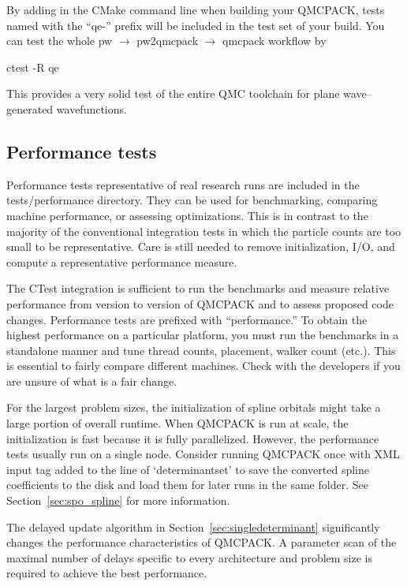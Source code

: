 By adding  in the CMake command line when building your QMCPACK,
tests named with the ``qe-'' prefix will be included in the test set of your build.
You can test the whole pw $\to$ pw2qmcpack $\to$ qmcpack workflow by

\begin{shade}
ctest -R qe
\end{shade}
This provides a very solid test of the entire QMC
toolchain for plane wave--generated wavefunctions.

\subsection{Performance tests}
\label{sec:perftests}
Performance tests representative of real research runs are included in the
tests/performance directory. They can be used for benchmarking, comparing machine
performance, or assessing optimizations. This is in
contrast to the majority of the conventional integration tests in which the particle
counts are too small to be representative. Care is still needed to
remove initialization, I/O, and compute a representative performance
measure.

The CTest integration is sufficient to run the benchmarks and measure
relative performance from version to version of QMCPACK and to assess
proposed code changes. Performance tests are prefixed with
``performance.'' To obtain the highest performance on a particular
platform, you must run the benchmarks in a standalone manner and tune
thread counts, placement, walker count (etc.). This is essential to
fairly compare different machines. Check with the
developers if you are unsure of what is a fair change.

For the largest problem sizes, the initialization of spline orbitals might
take a large portion of overall runtime. When QMCPACK is run at scale,
the initialization is fast because it is fully
parallelized. However, the performance tests usually run on a single node.
Consider running QMCPACK once with  XML input tag
added to the line of `determinantset' to save the converted spline
coefficients to the disk and load them for later runs in the same folder.
See Section~\ref{sec:spo_spline} for more information.

The delayed update algorithm in Section~\ref{sec:singledeterminant}
significantly changes the performance characteristics of QMCPACK.  A
parameter scan of the maximal number of delays specific to every
architecture and problem size is required to achieve the best
performance.

